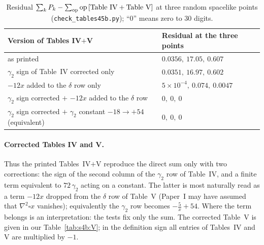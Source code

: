 \documentclass[aps,prd,onecolumn,10pt,nofootinbib,floatfix]{revtex4-2}
\newcommand{\PI}{Paper~I}
\begin{document}
\begin{table}[tb]
\caption{Residual $\sum_kP_k-\sum_{\rm op}{\rm op}\,[\text{Table IV}+\text{Table V}]$ at three random spacelike points
(\texttt{check\_tables45b.py}); ``0'' means zero to 30 digits.}
\label{tab:s4b:hyp}
\renewcommand{\arraystretch}{1.3}
\begin{ruledtabular}
\begin{tabular}{@{}ll@{}}
Version of Tables IV$+$V & Residual at the three points\\
\hline
as printed & $0.0356,\ 17.05,\ 0.607$\\
$\gamma_2$ sign of Table~IV corrected only & $0.0351,\ 16.97,\ 0.602$\\
$-12x$ added to the $\delta$ row only & $5\times10^{-4},\ 0.074,\ 0.0047$\\
$\gamma_2$ sign corrected $+$ $-12x$ added to the $\delta$ row & $0,\ 0,\ 0$\\
$\gamma_2$ sign corrected $+$ $\gamma_2$ constant $-18\to+54$ (equivalent) & $0,\ 0,\ 0$\\
\end{tabular}
\end{ruledtabular}
\end{table}

\paragraph*{Corrected Tables IV and V.}
Thus the printed Tables~IV$+$V reproduce the direct sum only with two corrections: the sign of the second column of
the $\gamma_2$ row of Table~IV, and a finite term equivalent to $72\,\gamma_2$ acting on a constant. The latter is most
naturally read as a term $-12x$ dropped from the $\delta$ row of Table~V (\PI{} may have assumed that
$\nabla^2\square x$ vanishes); equivalently the $\gamma_2$ row becomes $-\frac5x+54$. Where the term belongs is an
interpretation: the tests fix only the sum. The corrected Table~V is given in our Table~\ref{tab:s4b:V}; in the
definition sign all entries of Tables~IV and V are multiplied by $-1$.
\end{document}
